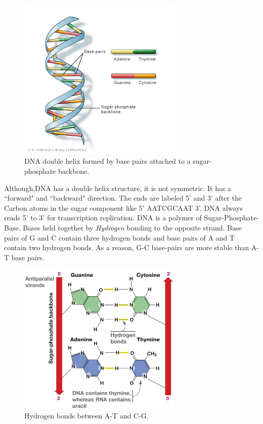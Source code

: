 \begin{figure}[!tb]
	\centering
	\includegraphics[width=0.7\textwidth]{figures/dna}
	\caption{DNA double helix formed by base pairs attached to a sugar-phosphate backbone.}
	\label{fig:dna}
\end{figure}


Although,DNA has a double helix structure, it is not symmetric. It has a ``forward" and ``backward" direction.  The ends are labeled 5' and 3' after the Carbon atoms in the sugar component like 5' AATCGCAAT 3'. DNA always reads 5' to 3' for transcription replication. DNA is a polymer of Sugar-Phosphate-Base. Bases held together by \textit{Hydrogen} bonding to the opposite strand. Base pairs of G and C contain three hydrogen bonds and base pairs of A and T contain two hydrogen bonds. As a reason, G-C base-pairs are more stable than A-T base pairs. 

\begin{figure}[!tb]
	\centering
	\includegraphics[width=0.7\textwidth]{figures/dna2}
	\caption{Hydrogen bonds between A-T and C-G.}
	\label{fig:dna2}
\end{figure}



